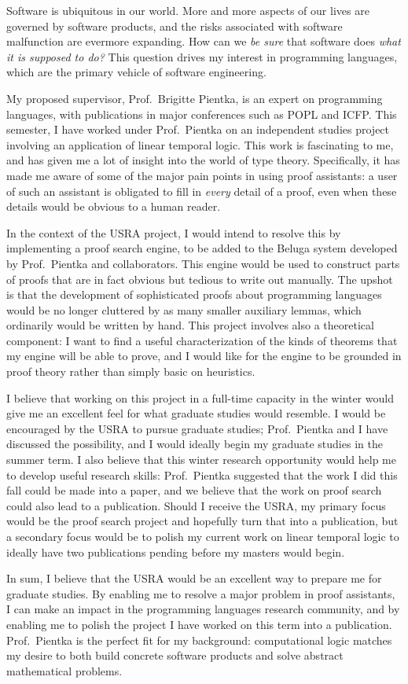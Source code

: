 \documentclass[11pt,letterpaper]{article}
\begin{document}
Software is ubiquitous in our world. More and more aspects of our lives are
governed by software products, and the risks associated with software
malfunction are evermore expanding. How can we \emph{be sure} that software
does \emph{what it is supposed to do?}
This question drives my interest in programming languages, which are the
primary vehicle of software engineering.

My proposed supervisor, Prof.~Brigitte Pientka, is an expert on programming
languages, with publications in major conferences such as POPL and ICFP.
This semester, I have worked under Prof.~Pientka on an independent studies
project involving an application of linear temporal logic.
This work is fascinating to me, and has given me a lot of insight into the
world of type theory. Specifically, it has made me aware of some of the major
pain points in using proof assistants: a user of such an assistant is obligated
to fill in \emph{every} detail of a proof, even when these details would be
obvious to a human reader.

In the context of the USRA project, I would intend to resolve this by
implementing a proof search engine, to be added to the Beluga system developed
by Prof.~Pientka and collaborators.
This engine would be used to construct parts of proofs that are in fact obvious
but tedious to write out manually. The upshot is that the development of
sophisticated proofs about programming languages would be no longer cluttered
by as many smaller auxiliary lemmas, which ordinarily would be written by hand.
This project involves also a theoretical component: I want to find a useful
characterization of the kinds of theorems that my engine will be able to prove,
and I would like for the engine to be grounded in proof theory rather than
simply basic on heuristics.

I believe that working on this project in a full-time capacity in the winter
would give me an excellent feel for what graduate studies would resemble.
I would be encouraged by the USRA to pursue graduate studies; Prof.~Pientka and
I have discussed the possibility, and I would ideally begin my graduate studies
in the summer term.
I also believe that this winter research opportunity would help me to develop
useful research skills: Prof.~Pientka suggested that the work I did this fall
could be made into a paper, and we believe that the work on proof search could
also lead to a publication.
Should I receive the USRA, my primary focus would be the proof search project
and hopefully turn that into a publication, but a secondary focus would be to
polish my current work on linear temporal logic to ideally have two
publications pending before my masters would begin.

In sum, I believe that the USRA would be an excellent way to prepare me for
graduate studies. By enabling me to resolve a major problem in proof
assistants, I can make an impact in the programming languages research
community, and by enabling me to polish the project I have worked on this term
into a publication. Prof.~Pientka is the perfect fit for my background:
computational logic matches my desire to both build concrete software products
and solve abstract mathematical problems.
\end{document}
